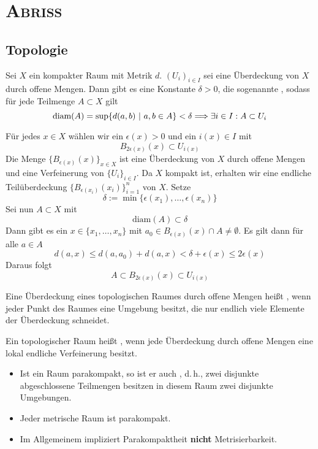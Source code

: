 \chapter{\textsc{Abriss}}
\section{Topologie}
Sei $X$ ein kompakter Raum mit Metrik $d$. $(U_i)_{i\in I}$ sei eine Überdeckung von $X$ durch offene Mengen. Dann gibt es eine Konstante $\delta > 0$, die sogenannte , sodass für jede Teilmenge $A \subset X$ gilt
\[ \text{diam}(A) = \sup \{d(a,b)~|~a,b \in A\} < \delta \overset{}{\Longrightarrow} \exists i \in I: A \subset U_i \]
\begin{Beweis}{}
Für jedes $x \in X$ wählen wir ein $\epsilon(x) > 0$ und ein $i(x) \in I$ mit
\[ B_{2\epsilon(x)}(x) \subset U_{i(x)} \]
Die Menge $\{ B_{\epsilon(x)}(x) \}_{x\in X}$ ist eine Überdeckung von $X$ durch offene Mengen und eine Verfeinerung von $\{U_i\}_{i\in I}$. Da $X$ kompakt ist, erhalten wir eine endliche Teilüberdeckung $\{ B_{\epsilon(x_i)}(x_i) \}_{i=1}^n$ von $X$. Setze
\[ \delta := \min\{ \epsilon(x_1), \ldots, \epsilon(x_n) \} \]
Sei nun $A \subset X$ mit
\[ \text{diam}(A) \subset \delta \]
Dann gibt es ein $x \in \{x_1,\ldots, x_n\}$ mit $a_0 \in B_{\epsilon(x)}(x)\cap A \neq \emptyset$. Es gilt dann für alle $a \in A$
\[ d(a,x) \leq d(a, a_0) + d(a, x) < \delta + \epsilon(x)\leq 2 \epsilon(x) \]
Daraus folgt
\[ A \subset B_{2\epsilon(x)}(x) \subset U_{i(x)} \]
\end{Beweis}

\Def{}
Eine Überdeckung eines topologischen Raumes durch offene Mengen heißt , wenn jeder Punkt des Raumes eine Umgebung besitzt, die nur endlich viele Elemente der Überdeckung schneidet.

\Def{}
Ein topologischer Raum heißt , wenn jede Überdeckung durch offene Mengen eine lokal endliche Verfeinerung besitzt.

\Bem{}
\begin{itemize}
	\item Ist ein Raum parakompakt, so ist er auch , d.\,h., zwei disjunkte abgeschlossene Teilmengen besitzen in diesem Raum zwei disjunkte Umgebungen.
	\item Jeder metrische Raum ist parakompakt.
	\item Im Allgemeinem impliziert Parakompaktheit \textbf{nicht} Metrisierbarkeit.
\end{itemize}

